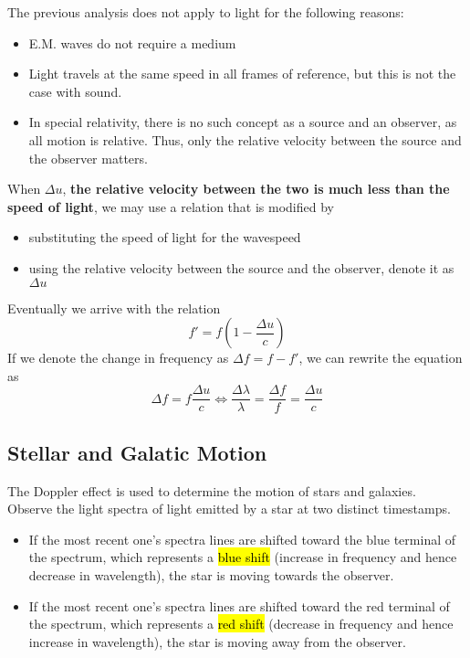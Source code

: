 \documentclass[a4paper,12pt]{article}
\newcommand{\lb}{\\[8pt]}
\newcommand{\paren}[1]{\left(#1\right)}
\begin{document}
The previous analysis does not apply to light for the following reasons:
\begin{itemize}
  \item E.M. waves do not require a medium
  \item Light travels at the same speed in all frames of reference, but this is not the case with sound.
  \item In special relativity, there is no such concept as a source and an observer, as all motion is relative. Thus, only the relative velocity between the source and the observer matters.
\end{itemize}

When $\Delta u$, \textbf{the relative velocity between the two is much less than the speed of light}, we may use a relation that is modified by
\begin{itemize}
  \item substituting the speed of light for the wavespeed
  \item using the relative velocity between the source and the observer, denote it as $\Delta u$
\end{itemize}
Eventually we arrive with the relation
\begin{equation}
  f' = f\paren{1 - \frac{\Delta u}{c}}
\end{equation}
If we denote the change in frequency as $\Delta f = f - f'$, we can rewrite the equation as
\begin{equation}
  \Delta f = f\frac{\Delta u}{c} \iff \frac{\Delta \lambda}{\lambda} = \frac{\Delta f}{f} = \frac{\Delta u}{c}
\end{equation}

\pagebreak

\subsection{Stellar and Galatic Motion}

The Doppler effect is used to determine the motion of stars and galaxies. \lb
Observe the light spectra of light emitted by a star at two distinct timestamps.
\begin{itemize}
  \item If the most recent one's spectra lines are shifted toward the blue terminal of the spectrum, which represents a \hl{blue shift} (increase in frequency and hence decrease in wavelength), the star is moving towards the observer.
  \item If the most recent one's spectra lines are shifted toward the red terminal of the spectrum, which represents a \hl{red shift} (decrease in frequency and hence increase in wavelength), the star is moving away from the observer.
\end{itemize}
\end{document}
